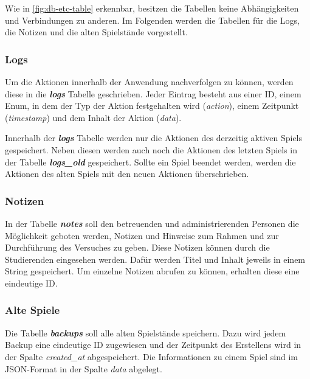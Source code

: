 Wie in \autoref{fig:db-etc-table} erkennbar, besitzen die Tabellen keine Abhängigkeiten und Verbindungen zu anderen. Im Folgenden werden die Tabellen für die Logs, die Notizen und die alten Spielstände vorgestellt.

\subsubsection{Logs}
Um die Aktionen innerhalb der Anwendung nachverfolgen zu können, werden diese in die \textbf{\textit{logs}} Tabelle geschrieben. Jeder Eintrag besteht aus einer ID, einem Enum, in dem der Typ der Aktion festgehalten wird (\textit{action}), einem Zeitpunkt (\textit{timestamp}) und dem Inhalt der Aktion (\textit{data}). 

Innerhalb der \textbf{\textit{logs}} Tabelle werden nur die Aktionen des derzeitig aktiven Spiels gespeichert. Neben diesen werden auch noch die Aktionen des letzten Spiels in der Tabelle \textbf{\textit{logs\_old}} gespeichert. Sollte ein Spiel beendet werden, werden die Aktionen des alten Spiels mit den neuen Aktionen überschrieben.

\subsubsection{Notizen}
In der Tabelle \textbf{\textit{notes}} soll den betreuenden und administrierenden Personen die Möglichkeit geboten werden, Notizen und Hinweise zum Rahmen und zur Durchführung des Versuches zu geben. Diese Notizen können durch die Studierenden eingesehen werden. Dafür werden Titel und Inhalt jeweils in einem String gespeichert. Um einzelne Notizen abrufen zu können, erhalten diese eine eindeutige ID.

\subsubsection{Alte Spiele}
Die Tabelle \textbf{\textit{backups}} soll alle alten Spielstände speichern. Dazu wird jedem Backup eine eindeutige ID zugewiesen und der Zeitpunkt des Erstellens wird in der Spalte \textit{created\_at} abgespeichert. Die Informationen zu einem Spiel sind im JSON-Format in der Spalte \textit{data} abgelegt.